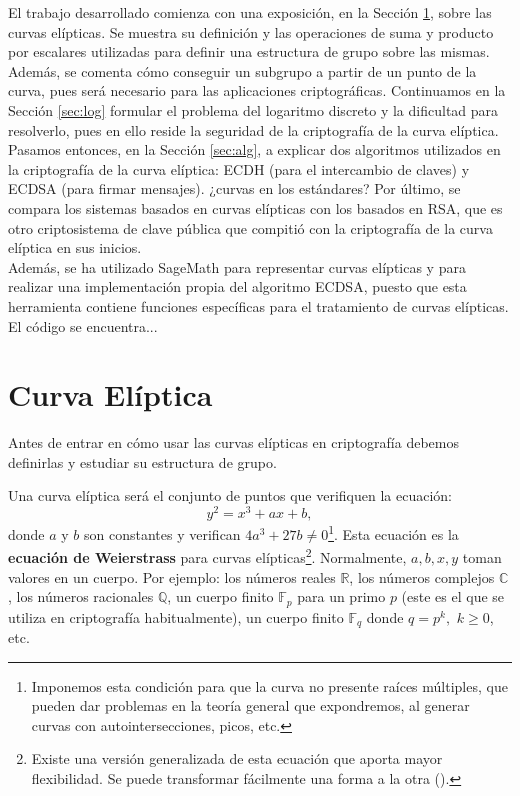 \documentclass[11pt]{article}
\begin{document}
El trabajo desarrollado comienza con una exposición, en la Sección \ref{sec:curva}, sobre las curvas elípticas. Se muestra su definición y las operaciones de suma y producto por escalares utilizadas para definir una estructura de grupo sobre las mismas. Además, se comenta cómo conseguir un subgrupo a partir de un punto de la curva, pues será necesario para las aplicaciones criptográficas. Continuamos en la Sección \ref{sec:log} formular el problema del logaritmo discreto y la dificultad para resolverlo, pues en ello reside la seguridad de la criptografía de la curva elíptica. Pasamos entonces, en la Sección \ref{sec:alg}, a explicar dos algoritmos utilizados en la criptografía de la curva elíptica: ECDH (para el intercambio de claves) y ECDSA (para firmar mensajes).
¿curvas en los estándares?
Por último, se compara los sistemas basados en curvas elípticas con los basados en RSA, que es otro criptosistema de clave pública que compitió con la criptografía de la curva elíptica en sus inicios.\\

Además, se ha utilizado SageMath para representar curvas elípticas y para realizar una implementación propia del algoritmo ECDSA, puesto que esta herramienta contiene funciones específicas para el tratamiento de curvas elípticas. El código se encuentra...


\section{Curva Elíptica}
\label{sec:curva}
Antes de entrar en cómo usar las curvas elípticas en criptografía debemos definirlas y estudiar su estructura de grupo.

Una curva elíptica será el conjunto de puntos que verifiquen la ecuación:
\[y^2 = x^3 + ax + b,\]
donde $a$ y $b$ son constantes y verifican $4a^3+27b \neq 0$\footnote{Imponemos esta condición para que la curva no presente raíces múltiples, que pueden dar problemas en la teoría general que expondremos, al generar curvas con autointersecciones, picos, etc. }. Esta ecuación es la \textbf{ecuación de Weierstrass} para curvas elípticas\footnote{Existe una versión generalizada de esta ecuación que aporta mayor flexibilidad. Se puede transformar fácilmente una forma a la otra (\cite{washington_elliptic_2008}).}. Normalmente, $a, b, x, y$ toman valores en un cuerpo. Por ejemplo: los números reales $\mathbb{R}$, los números complejos $\mathbb{C}$, los números racionales $\mathbb{Q}$, un cuerpo finito $\mathbb{F}_p$ para un primo $p$ (este es el que se utiliza en criptografía habitualmente), un cuerpo finito $\mathbb{F}_q$ donde $q = p^k,$ $k \ge 0$, etc.
\end{document}
